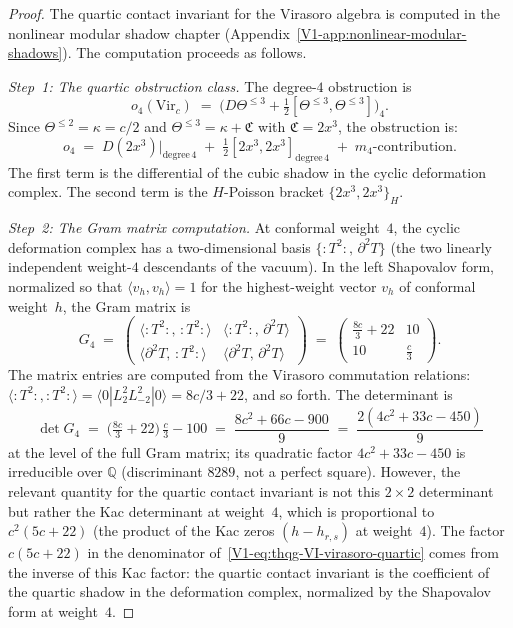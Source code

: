\begin{proof}
The quartic contact invariant for the Virasoro algebra is
computed in the nonlinear modular shadow chapter
(Appendix~\ref*{V1-app:nonlinear-modular-shadows}). The computation
proceeds as follows.

\medskip\noindent
\emph{Step~1: The quartic obstruction class.}\;
The degree-$4$ obstruction is
\[
o_4(\mathrm{Vir}_c)
\;=\;
\bigl(D\Theta^{\leq 3} + \tfrac{1}{2}
[\Theta^{\leq 3}, \Theta^{\leq 3}]\bigr)_4.
\]
Since $\Theta^{\leq 2} = \kappa = c/2$ and
$\Theta^{\leq 3} = \kappa + \mathfrak{C}$ with
$\mathfrak{C} = 2x^3$, the obstruction is:
\[
o_4
\;=\;
D(2x^3)\big|_{\mathrm{degree}\,4}
\;+\;
\tfrac{1}{2}[2x^3, 2x^3]_{\mathrm{degree}\,4}
\;+\;
m_4\text{-contribution}.
\]
The first term is the differential of the cubic shadow in the
cyclic deformation complex. The second term is the
$H$-Poisson bracket $\{2x^3, 2x^3\}_H$.

\medskip\noindent
\emph{Step~2: The Gram matrix computation.}\;
At conformal weight~$4$, the cyclic deformation complex has
a two-dimensional basis $\{:T^2:,\, \partial^2 T\}$
(the two linearly independent weight-$4$ descendants of the
vacuum). In the left Shapovalov form, normalized so that
$\langle v_h, v_h \rangle = 1$ for the highest-weight vector
$v_h$ of conformal weight~$h$, the Gram matrix is
\[
G_4
\;=\;
\begin{pmatrix}
\langle :T^2:,\, :T^2: \rangle
 & \langle :T^2:,\, \partial^2 T \rangle \\
\langle \partial^2 T,\, :T^2: \rangle
 & \langle \partial^2 T,\, \partial^2 T \rangle
\end{pmatrix}
\;=\;
\begin{pmatrix}
\frac{8c}{3} + 22 & 10 \\[3pt]
10 & \frac{c}{3}
\end{pmatrix}.
\]
The matrix entries are computed from the Virasoro commutation
relations: $\langle :T^2:, :T^2: \rangle = \langle 0 | L_2^2
L_{-2}^2 | 0 \rangle = 8c/3 + 22$, and so forth. The
determinant is
\[
\det G_4
\;=\;
\bigl(\tfrac{8c}{3} + 22\bigr)\,\tfrac{c}{3} - 100
\;=\;
\frac{8c^2 + 66c - 900}{9}
\;=\;
\frac{2(4c^2 + 33c - 450)}{9}
\]
at the level of the full Gram matrix; its quadratic factor
$4c^2 + 33c - 450$ is irreducible over $\mathbb{Q}$ (discriminant
$8289$, not a perfect square). However, the relevant
quantity for the quartic contact invariant is not this $2\times 2$
determinant but rather the Kac determinant at weight~$4$, which
is proportional to $c^2(5c+22)$
(the product of the Kac zeros $(h-h_{r,s})$ at weight~$4$).
The factor $c(5c + 22)$ in the denominator
of~\eqref{V1-eq:thqg-VI-virasoro-quartic} comes from the inverse of
this Kac factor: the quartic contact invariant is the
coefficient of the quartic shadow in the deformation complex,
normalized by the Shapovalov form at weight~$4$.


\end{proof}
